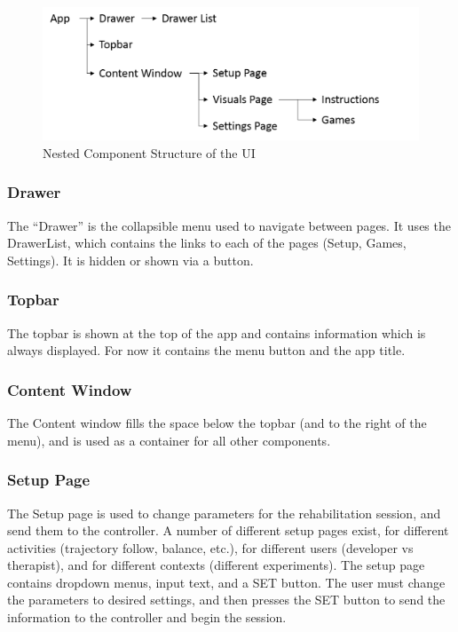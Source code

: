 \documentclass{article}
\begin{document}
	\begin{figure}[t] 
		\centering
		\includegraphics[width=0.75\linewidth]{Components}
		\caption{Nested Component Structure of the UI}
		\label{fig:VerInt}
	\end{figure}
	
	\subsubsection{Drawer}
	
	The ``Drawer'' is the collapsible menu used to navigate between pages. It uses the DrawerList, which contains the links to each of the pages (Setup, Games, Settings). It is hidden or shown via a button. 
	
	\subsubsection{Topbar}
	
	The topbar is shown at the top of the app and contains information which is always displayed. For now it contains the menu button and the app title. 
	
	\subsubsection{Content Window}
	
	The Content window fills the space below the topbar (and to the right of the menu), and is used as a container for all other components.
	
	\subsubsection{Setup Page}
	
	The Setup page is used to change parameters for the rehabilitation session, and send them to the controller. A number of different setup pages exist, for different activities (trajectory follow, balance, etc.), for different users (developer vs therapist), and for different contexts (different experiments). The setup page contains dropdown menus, input text, and a SET button. The user must change the parameters to desired settings, and then presses the SET button to send the information to the controller and begin the session.
	
\end{document}
